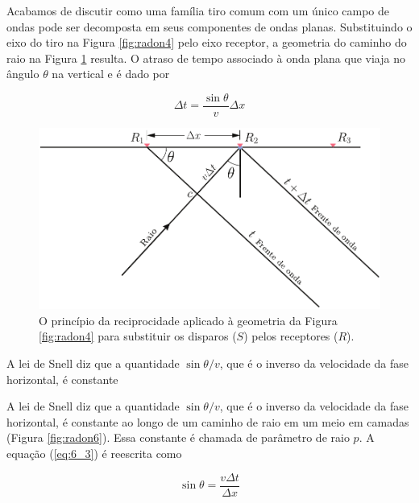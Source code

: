Acabamos de discutir como uma família tiro comum com um único campo de ondas pode ser decomposta em seus componentes de ondas planas. Substituindo o eixo do tiro na Figura \ref{fig:radon4} pelo eixo receptor, a geometria do caminho do raio na Figura \ref{fig:radon5} resulta. O atraso de tempo associado à onda plana que viaja no ângulo $\theta$ na vertical e é dado por

\begin{equation}
\Delta t=\frac{\sin \theta}{v} \Delta x
\label{eq:6_3}
\end{equation}

\begin{figure}[H]
\centering
\includegraphics[width=12cm]{figuras/cap2/radon5.pdf}
\caption{O princípio da reciprocidade aplicado à geometria da Figura \ref{fig:radon4} para substituir os disparos ($S$) pelos receptores ($R$).}
\label{fig:radon5}
\end{figure}

A lei de Snell diz que a quantidade $\sin\theta/v$, que é o inverso da velocidade da fase horizontal, é constante

A lei de Snell diz que a quantidade $\sin\theta/v$, que é o inverso da velocidade da fase horizontal, é constante ao longo de um caminho de raio em um meio em camadas (Figura \ref{fig:radon6}). Essa constante é chamada de parâmetro de raio $p$. A equação (\ref{eq:6_3}) é reescrita como 

\begin{equation}
\sin\theta=\frac{v\Delta t}{\Delta x}
\label{eq:6_3b}
\end{equation}

